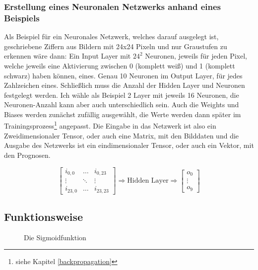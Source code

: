 \subsubsection{Erstellung eines Neuronalen Netzwerks anhand eines Beispiels}

Als Beispiel für ein Neuronales Netzwerk, welches darauf ausgelegt ist, geschriebene Ziffern aus Bildern mit 24x24 Pixeln und nur Graustufen zu erkennen wäre dann: Ein Input Layer mit $24^2$ Neuronen, jeweils für jeden Pixel, welche jeweils eine Aktivierung zwischen 0 (komplett weiß) und 1 (komplett schwarz) haben können, eines. Genau 10 Neuronen im Output Layer, für jedes Zahlzeichen eines. Schließlich muss die Anzahl der Hidden Layer und Neuronen festgelegt werden. Ich wähle als Beispiel 2 Layer mit jeweils 16 Neuronen, die Neuronen-Anzahl kann aber auch unterschiedlich sein. Auch die Weights und Biases werden zunächst zufällig ausgewählt, die Werte werden dann später im Trainingsprozess\footnote{siehe Kapitel \ref{backpropagation}} angepasst. Die Eingabe in das Netzwerk ist also ein Zweidimensionaler Tensor, oder auch eine Matrix, mit den Bilddaten und die Ausgabe des Netzwerks ist ein eindimensionaler Tensor, oder auch ein Vektor, mit den Prognosen.

\begin{equation}
    \begin{bmatrix}
        i_{0,0} & \ldots & i_{0,23} \\
        \vdots  & \ddots & \vdots  \\
        i_{23,0} & \ldots & i_{23,23}
    \end{bmatrix}
    \Longrightarrow
    \text{Hidden Layer}
    \Longrightarrow
    \begin{bmatrix}
        o_0 \\
        \vdots \\
        o_9
    \end{bmatrix}
\end{equation}

\subsection{Funktionsweise} \label{funktionsweise}

\begin{wrapfigure}{r}{60mm}
    \resizebox{6cm}{!}{}
    \caption[Sigmoid]{Die Sigmoidfunktion}
    \label{sigmoid}
\end{wrapfigure}


